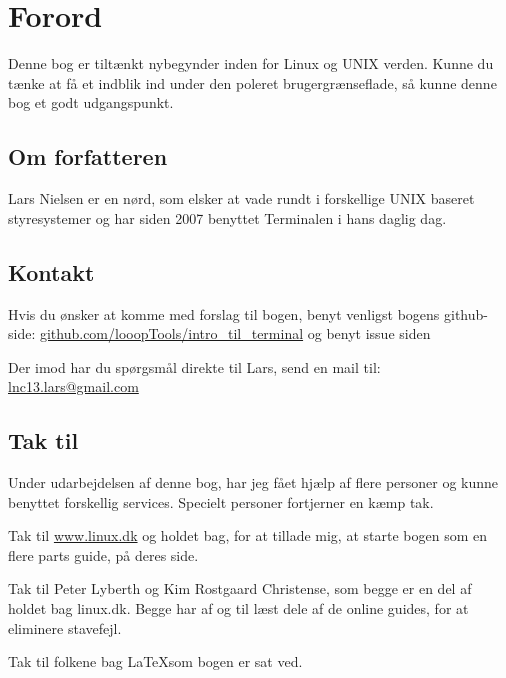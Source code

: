 \chapter*{Forord}
Denne bog er tiltænkt nybegynder inden for Linux og UNIX verden. Kunne du tænke at få et indblik ind under den poleret brugergrænseflade, så kunne denne bog et godt udgangspunkt. 

\section*{Om forfatteren}
Lars Nielsen er en nørd, som elsker at vade rundt i forskellige UNIX baseret styresystemer og har siden 2007 benyttet Terminalen i hans daglig dag.

\section*{Kontakt}
Hvis du ønsker at komme med forslag til bogen, benyt venligst bogens github-side:
 \href{https://www.github.com/looopTools/intro_til_terminal}{github.com/looopTools/intro\_til\_terminal} og benyt issue siden \par
Der imod har du spørgsmål direkte til Lars, send en mail til: \href{mailto:lnc13.lars@gmail.com}{lnc13.lars@gmail.com}

\section*{Tak til}
Under udarbejdelsen af denne bog, har jeg fået hjælp af flere personer og kunne benyttet forskellig services. Specielt personer fortjerner en kæmp tak. \par

Tak til \href{http://www.linux.dk}{www.linux.dk} og holdet bag, for at tillade mig, at starte bogen som en flere parts guide, på deres side. \par

Tak til Peter Lyberth og Kim Rostgaard Christense, som begge er en del af holdet bag linux.dk. Begge har af og til læst dele af de online guides, for at eliminere stavefejl. \par

Tak til folkene bag \LaTeX som bogen er sat ved.

